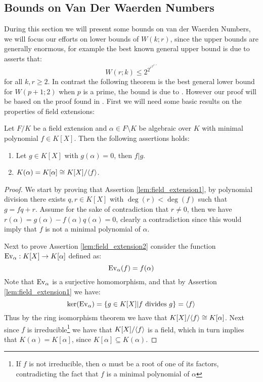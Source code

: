 \subsection{Bounds on Van Der Waerden Numbers}
During this section we will present some bounds on van der Waerden Numbers, we will focus our efforts on lower bounds of $W(k; r)$, since the upper bounds are generally enormous, for example the best known general upper bound is due to \cite{van_der_waerden_upper_bound} asserts that:
\begin{equation*}
	W(r; k) \leq 2^{2^{r^{2^{2^{k + 9}}}}}
\end{equation*}
for all $k, r \geq 2$. In contrast the following theorem is the best general lower bound for $W(p + 1; 2)$ when $p$ is a prime, the bound is due to \cite{berlekamp_lower_bound}. However our proof will be based on the proof found in \cite{berlekamp_proof}. First we will need some basic results on the properties of field extensions:

\newpage
\begin{lemma}\label{lem:field_extension}
	Let $F / K$ be a field extension and $\alpha \in F \setminus K$ be algebraic over $K$ with minimal polynomial $f \in K[X]$. Then the following assertions holds:
	\begin{enumerate}
		\item Let $g \in K[X]$ with $g(\alpha) = 0$, then $f | g$. \label{lem:field_extension1}
		\item $K(\alpha) = K[\alpha] \cong K[X] / \langle f\rangle$. \label{lem:field_extension2}
	\end{enumerate}
\end{lemma}
\begin{proof}
	We start by proving that Assertion \ref{lem:field_extension1}, by polynomial division there exists $q, r \in K[X]$ with $\deg(r) < \deg(f)$ such that $g = fq + r$. Assume for the sake of contradiction that $r \neq 0$, then we have $r(\alpha) = g(\alpha) - f(\alpha)q(\alpha) = 0$, clearly a contradiction since this would imply that $f$ is not a minimal polynomial of $\alpha$.

	Next to prove Assertion \ref{lem:field_extension2} consider the function $\textnormal{Ev}_{\alpha}: K[X] \to K[\alpha]$ defined as:
	\begin{equation*}
		\textnormal{Ev}_{\alpha}(f) = f(\alpha)
	\end{equation*}
	Note that $\textnormal{Ev}_{\alpha}$ is a surjective homomorphism, and that by Assertion \ref{lem:field_extension1} we have:
	\begin{equation*}
		\ker(\textnormal{Ev}_{\alpha}) = \left\{g \in K[X] \middle| f \text{ divides }  g\right\} = \langle f\rangle
	\end{equation*}
	Thus by the ring isomorphism theorem we have that $K[X] / \langle f\rangle \cong K[\alpha]$. Next since $f$ is irreducible\footnote{If $f$ is not irreducible, then $\alpha$ must be a root of one of its factors, contradicting the fact that $f$ is a minimal polynomial of $\alpha$} we have that $K[X] / \langle f\rangle$ is a field, which in turn implies that $K(\alpha) = K[\alpha]$, since $K[\alpha] \subseteq K(\alpha)$.
\end{proof}

